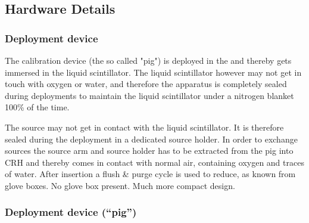 \subsection{Hardware Details}
\subsubsection{Deployment device}

\begin{description}
\item The calibration device (the so called "pig") is deployed in the \lsv and thereby gets immersed in the liquid scintillator. The liquid scintillator however may not get in touch with oxygen or water, and therefore the apparatus is completely sealed during deployments to maintain the liquid scintillator under a nitrogen blanket 100\% of the time.

\item The source may not get in contact with the liquid scintillator. It is therefore sealed during the deployment in a dedicated source holder. In order to exchange sources the source arm and source holder has to be extracted from the pig into CRH and thereby comes in contact with normal air, containing oxygen and traces of water. After insertion a flush \& purge cycle is used to reduce, as known from glove boxes. No glove box present. Much more compact design.

\end{description}


\subsubsection{Deployment device (``pig'')}

